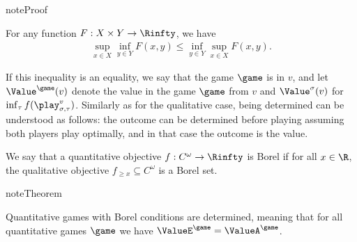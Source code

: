 \documentclass[letterpaper,10pt,english]{sphinxmanual}
\begin{document}
\begin{sphinxadmonition}{note}{Proof}

For any function \(F : X \times Y \to \Rinfty\), we have
\begin{equation*}
\begin{split}\sup_{x \in X} \inf_{y \in Y} F(x,y) \le \inf_{y \in Y} \sup_{x \in X} F(x,y).\end{split}
\end{equation*}\end{sphinxadmonition}

If this inequality is an equality, we say that the game \(\game\) is
 in \(v\), and let \(\Value^{\game}(v)\) denote the value in the
game \(\game\) from \(v\) and \(\Value^\sigma(v)\) for
\(\inf_{\tau} f(\play_{\sigma,\tau}^{v})\). Similarly as for the
qualitative case, being determined can be understood as follows: the
outcome can be determined before playing assuming both players play
optimally, and in that case the outcome is the value.

We say that a quantitative objective \(f : C^\omega \to \Rinfty\) is Borel
if for all \(x \in \R\), the qualitative objective
\(f_{\ge x} \subseteq C^\omega\) is a Borel set.

\begin{sphinxadmonition}{note}{Theorem}

Quantitative games with Borel
conditions are determined, meaning that for all quantitative games
\(\game\) we have \(\ValueE^{\game} = \ValueA^{\game}\).
\end{sphinxadmonition}
\end{document}
